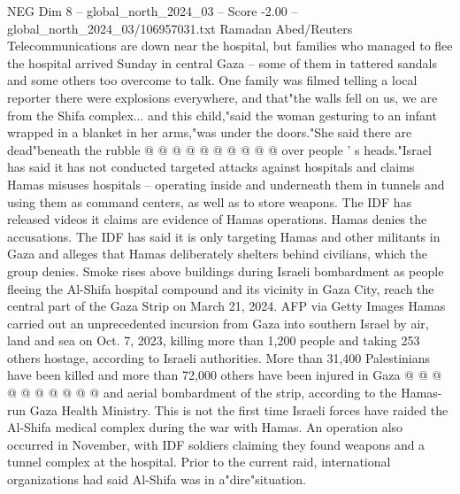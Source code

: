 \begin{textsample}{NEG Dim 8 – global\_north\_2024\_03 – Score -2.00 – global\_north\_2024\_03/106957031.txt}
Ramadan Abed/Reuters Telecommunications are down near the hospital, but families who managed to flee the hospital arrived Sunday in central Gaza -- some of them in tattered sandals and some others too overcome to talk.
One family was filmed telling a local reporter there were explosions everywhere, and that"the walls fell on us, we are from the Shifa complex... and this child,"said the woman gesturing to an infant wrapped in a blanket in her arms,"was under the doors."She said there are dead"beneath the rubble @ @ @ @ @ @ @ @ @ @ over people ' s heads."Israel has said it has not conducted targeted attacks against hospitals and claims Hamas misuses hospitals -- operating inside and underneath them in tunnels and using them as command centers, as well as to store weapons.
The IDF has released videos it claims are evidence of Hamas operations.
Hamas denies the accusations.
The IDF has said it is only targeting Hamas and other militants in Gaza and alleges that Hamas deliberately shelters behind civilians, which the group denies.
Smoke rises above buildings during Israeli bombardment as people fleeing the Al-Shifa hospital compound and its vicinity in Gaza City, reach the central part of the Gaza Strip on March 21, 2024.
AFP via Getty Images Hamas carried out an unprecedented incursion from Gaza into southern Israel by air, land and sea on Oct. 7, 2023, killing more than 1,200 people and taking 253 others hostage, according to Israeli authorities.
More than 31,400 Palestinians have been killed and more than 72,000 others have been injured in Gaza @ @ @ @ @ @ @ @ @ @ and aerial bombardment of the strip, according to the Hamas-run Gaza Health Ministry.
This is not the first time Israeli forces have raided the Al-Shifa medical complex during the war with Hamas.
An operation also occurred in November, with IDF soldiers claiming they found weapons and a tunnel complex at the hospital.
Prior to the current raid, international organizations had said Al-Shifa was in a"dire"situation.

\end{textsample}
